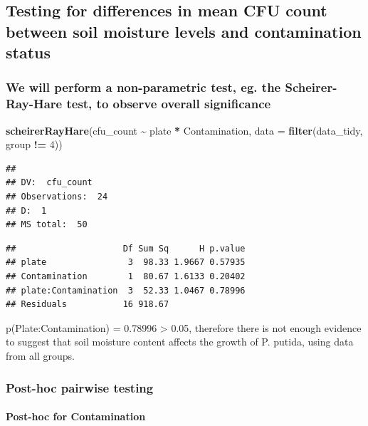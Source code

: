 \documentclass[
]{article}
\newenvironment{Shaded}{\begin{snugshade}}{\end{snugshade}}
\newcommand{\AttributeTok}[1]{\textcolor[rgb]{0.13,0.29,0.53}{#1}}
\newcommand{\DecValTok}[1]{\textcolor[rgb]{0.00,0.00,0.81}{#1}}
\newcommand{\FunctionTok}[1]{\textcolor[rgb]{0.13,0.29,0.53}{\textbf{#1}}}
\newcommand{\NormalTok}[1]{#1}
\newcommand{\SpecialCharTok}[1]{\textcolor[rgb]{0.81,0.36,0.00}{\textbf{#1}}}
\begin{document}
\subsection{Testing for differences in mean CFU count between soil
moisture levels and contamination
status}\label{testing-for-differences-in-mean-cfu-count-between-soil-moisture-levels-and-contamination-status}

\subsubsection{We will perform a non-parametric test, eg. the
Scheirer-Ray-Hare test, to observe overall
significance}\label{we-will-perform-a-non-parametric-test-eg.-the-scheirer-ray-hare-test-to-observe-overall-significance}

\begin{Shaded}
\begin{Highlighting}[]
\FunctionTok{scheirerRayHare}\NormalTok{(cfu\_count }\SpecialCharTok{\textasciitilde{}}\NormalTok{ plate }\SpecialCharTok{*}\NormalTok{ Contamination, }\AttributeTok{data =} \FunctionTok{filter}\NormalTok{(data\_tidy, group }\SpecialCharTok{!=} \DecValTok{4}\NormalTok{))}
\end{Highlighting}
\end{Shaded}

\begin{verbatim}
## 
## DV:  cfu_count 
## Observations:  24 
## D:  1 
## MS total:  50
\end{verbatim}

\begin{verbatim}
##                     Df Sum Sq      H p.value
## plate                3  98.33 1.9667 0.57935
## Contamination        1  80.67 1.6133 0.20402
## plate:Contamination  3  52.33 1.0467 0.78996
## Residuals           16 918.67
\end{verbatim}

p(Plate:Contamination) = 0.78996 \textgreater{} 0.05, therefore there is
not enough evidence to suggest that soil moisture content affects the
growth of P. putida, using data from all groups.

\subsubsection{Post-hoc pairwise
testing}\label{post-hoc-pairwise-testing}

\paragraph{Post-hoc for Contamination}\label{post-hoc-for-contamination}
\end{document}
